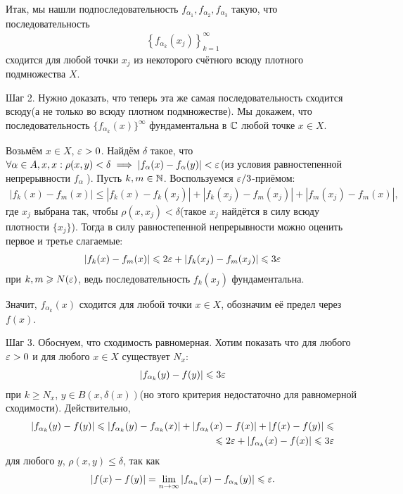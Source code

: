 \documentclass[../complex-analysis.tex]{subfiles}
\begin{document}
Итак, мы нашли подпоследовательность $ f_{\alpha_1}, f_{\alpha_2}, f_{\alpha_3} $ такую, что последовательность
\begin{align*}
 \left\{f_{\alpha_{k}}(x_j) \right\}_{k=1}^{\infty}
\end{align*} сходится для любой точки $ x_j $ из некоторого счётного всюду плотного подмножества $ X $.

Шаг 2. Нужно доказать, что теперь эта же самая последовательность сходится всюду(а не только во всюду плотном подмножестве). Мы докажем, что последовательность $ \{f_{\alpha_k}(x)\}_{}^{\infty}   $ фундаментальна в $ \mathbb{C} $ любой точке $ x \in X $.

Возьмём $ x \in X $, $ \varepsilon > 0 $. Найдём $ \delta $ такое, что $\forall \alpha \in A, x, x : \rho(x, y) < \delta \implies | f_\alpha(x) - f_\alpha(y)| < \varepsilon$(из условия равностепенной непрерывности $f_\alpha$ ). Пусть $ k, m \in \mathbb{N} $. Воспользуемся $ \varepsilon / 3 $-приёмом:
\begin{align*}
 \left| f_{k}(x) - f_{m}(x) \right|\leqslant \left| f_k(x) - f_k(x_j) \right| + \left| f_k(x_j) - f_m(x_j) \right| + \left| f_m(x_j) - f_m(x) \right|,
\end{align*} где $ x_j $ выбрана так, чтобы $ \rho(x, x_j) < \delta $(такое $x_j$ найдётся в силу всюду плотности $\{ x_j\}$). Тогда в силу равностепенной непрерывности можно оценить первое и третье слагаемые:
\begin{align*}
 \left| f_k(x)-f_m(x) \right| \leqslant 2\varepsilon + \left| f_k(x_j) - f_m(x_j) \right| \leqslant 3\varepsilon
\end{align*} при $ k, m \geqslant N(\varepsilon) $, ведь последовательность $ f_k(x_j) $ фундаментальна.

Значит, $ f_{\alpha_k}(x) $ сходится для любой точки $ x \in X $, обозначим её предел через $ f(x) $.

Шаг 3. Обоснуем, что сходимость равномерная. Хотим показать что для любого $ \varepsilon > 0 $ и для любого $ x \in X $ существует $ N_x $:
\begin{align*}
 \left|f_{\alpha_k}(y) - f(y) \right| \leqslant 3\varepsilon
\end{align*} при $ k \geqslant N_x $, $ y \in B(x, \delta(x)) $(но этого критерия недостаточно для равномерной сходимости). Действительно,
\begin{align*}
 \left| f_{\alpha_k}(y) - f(y) \right| \leqslant \left| f_{\alpha_k}(y) - f_{\alpha_k}(x) \right| + \left| f_{\alpha_k}(x) - f(x) \right| + \left| f(x) - f(y) \right| \leqslant \\ \leqslant 2\varepsilon + \left| f_{\alpha_k}(x) - f(x) \right| \leqslant 3\varepsilon
\end{align*}  для любого $ y $, $ \rho(x, y) \leqslant \delta $, так как
\begin{align*}
 \left| f(x) - f(y) \right| = \lim_{n \to \infty} \left|f_{\alpha_n}(x) - f_{\alpha_n}(y) \right| \leqslant \varepsilon.
\end{align*} 
\end{document}
